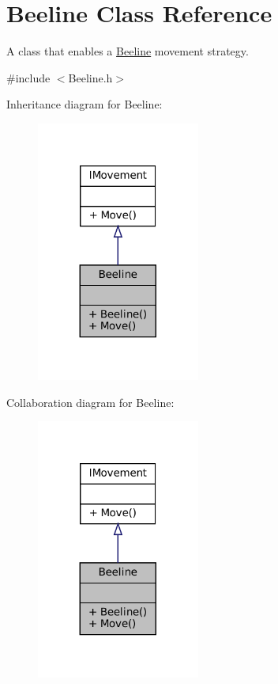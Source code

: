\hypertarget{classBeeline}{}\section{Beeline Class Reference}
\label{classBeeline}


A class that enables a \hyperlink{classBeeline}{Beeline} movement strategy.  




{\ttfamily \#include $<$Beeline.\+h$>$}



Inheritance diagram for Beeline\+:\nopagebreak
\begin{figure}[H]
\begin{center}
\leavevmode
\includegraphics[width=152pt]{classBeeline__inherit__graph}
\end{center}
\end{figure}


Collaboration diagram for Beeline\+:\nopagebreak
\begin{figure}[H]
\begin{center}
\leavevmode
\includegraphics[width=152pt]{classBeeline__coll__graph}
\end{center}
\end{figure}
